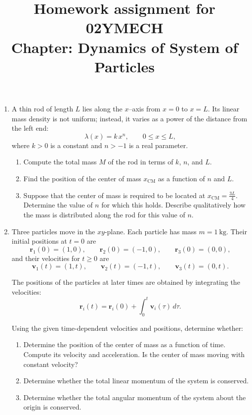 \documentclass[12pt]{article}
\title{Homework assignment for 02YMECH \\ Chapter: Dynamics of System of Particles}
\begin{document}
\date{}
\maketitle
\vspace{-0.8in}

\begin{enumerate}

\item A thin rod of length $L$ lies along the $x$–axis from $x = 0$ to $x = L$.  
Its linear mass density is not uniform; instead, it varies as a power of the distance from the left end:
\[
\lambda(x) = k\,x^{n}, \qquad 0 \le x \le L,
\]
where $k>0$ is a constant and $n>-1$ is a real parameter.

\begin{enumerate}
    \item Compute the total mass $M$ of the rod in terms of $k$, $n$, and $L$.
    \item Find the position of the center of mass $x_{\mathrm{CM}}$ as a function of $n$ and $L$.
    \item Suppose that the center of mass is required to be located at $x_{\mathrm{CM}} = \frac{3L}{4}$. Determine the value of $n$ for which this holds. Describe qualitatively how the mass is distributed along the rod for this value of $n$.
\end{enumerate}

\item Three particles move in the $xy$-plane. Each particle has mass $m = 1~\mathrm{kg}$. Their initial positions at $t=0$ are
\[
\mathbf r_1(0) = (1,0), \qquad
\mathbf r_2(0) = (-1,0), \qquad
\mathbf r_3(0) = (0,0),
\]
and their velocities for $t\ge 0$ are
\[
\mathbf v_1(t) = (1, t), \qquad
\mathbf v_2(t) = (-1, t), \qquad
\mathbf v_3(t) = (0, t).
\]

The positions of the particles at later times are obtained by integrating the velocities:
\[
\mathbf r_i(t) = \mathbf r_i(0) + \int_0^t \mathbf v_i(\tau)\, d\tau.
\]

Using the given time-dependent velocities and positions, determine whether:

\begin{enumerate}
    \item[(a)] Determine the position of the center of mass as a function of time. Compute its velocity and acceleration. Is the center of mass moving with constant velocity?
    \item[(b)] Determine whether the total linear momentum of the system is conserved.
    \item[(c)] Determine whether the total angular momentum of the system about the origin is conserved.
\end{enumerate}



\end{enumerate}
\end{document}
